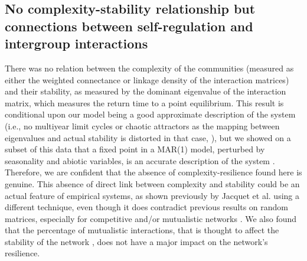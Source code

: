 \documentclass[9pt,twocolumn,twoside,lineno]{pnas-new}
\begin{document}
\subsection*{No complexity-stability relationship but connections between self-regulation
and intergroup interactions}

There was no relation between the complexity of the communities (measured
as either the weighted connectance or linkage density of the interaction
matrices) and their stability, as measured by the dominant eigenvalue
of the interaction matrix, which measures the return time to a point
equilibrium. This result is conditional upon our model being a good
approximate description of the system (i.e., no multiyear limit cycles
or chaotic attractors as the mapping between eigenvalues and actual
stability is distorted in that case, ),
but we showed on a subset of this data that a fixed point in a MAR(1)
model, perturbed by seasonality and abiotic variables, is an accurate
description of the system \cite{barraquand_coastal_2018}. Therefore,
we are confident that the absence of complexity-resilience found here
is genuine. This absence of direct link between complexity and stability
could be an actual feature of empirical systems, as shown previously
by Jacquet et al. \cite{jacquet_no_2016} using a different technique,
even though it does contradict previous results on random matrices,
especially for competitive and/or mutualistic networks \cite{allesina_stability_2012}.
We also found that the percentage of mutualistic interactions, that
is thought to affect the stability of the network \cite{mougi2012diversity,coyte_ecology_2015,garcia-callejas_multiple_2018},
does not have a major impact on the network's resilience.
\end{document}
